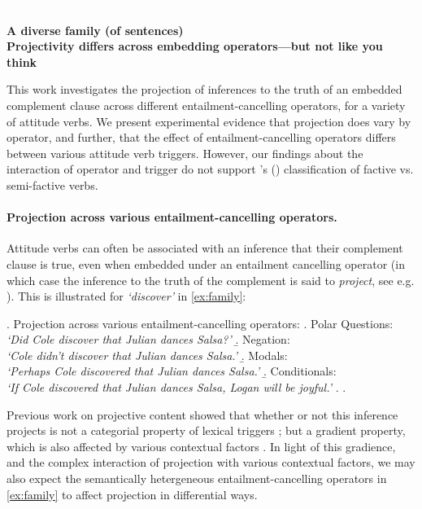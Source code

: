\documentclass[12pt, a4paper]{scrartcl}
\newcommand{\posscite}[1]{\citeauthor{#1}'s (\citeyear{#1})}
\begin{document}

\textcolor{white}{.} \vspace{-2.9\baselineskip} \\
\begin{center}
	\textbf{\large%
		A diverse family (of sentences)\\ Projectivity differs across embedding operators---but not like you think}
\end{center}

\noindent This work investigates the projection of inferences to the truth of an embedded complement clause across different entailment-cancelling operators, for a variety of attitude verbs. We present experimental evidence that projection does vary by operator, and further, that the effect of entailment-cancelling operators differs between various attitude verb triggers. However, our findings about the interaction of operator and trigger do not support \posscite{karttunen71b} classification of factive vs. semi-factive verbs.

\paragraph{Projection across various entailment-cancelling operators.}
	Attitude verbs can often be associated with an inference that their complement clause is true, even when embedded under an entailment cancelling operator (in which case the inference to the truth of the complement is said to \emph{project}, see e.g. \citealp{karttunen71b}). This is illustrated for \emph{\lq discover\rq} in \ref{ex:family}:

	\ex. \label{ex:family} Projection across various entailment-cancelling operators:
		\a. Polar Questions:\\
			\emph{\lq Did Cole discover that Julian dances Salsa?\rq}
		\b. Negation:\\
			\emph{\lq Cole didn't discover that Julian dances Salsa.\rq}
		\b. Modals:\\
			\emph{\lq Perhaps Cole discovered that Julian dances Salsa.\rq}
		\b. Conditionals:\\
			\emph{\lq If Cole discovered that Julian dances Salsa, Logan will be joyful.\rq}
		\z.
	\z.

	Previous work on projective content showed that whether or not this inference projects is not a categorial property of lexical triggers \citep{tbd-variability}; but a gradient property, which is also affected by various contextual factors \citep{brst-salt10,brst-ar,degen-tonhauser-openmind}. In light of this gradience, and the complex interaction of projection with various contextual factors, we may also expect the semantically hetergeneous entailment-cancelling operators in \ref{ex:family} to affect projection in differential ways.\\
\end{document}
